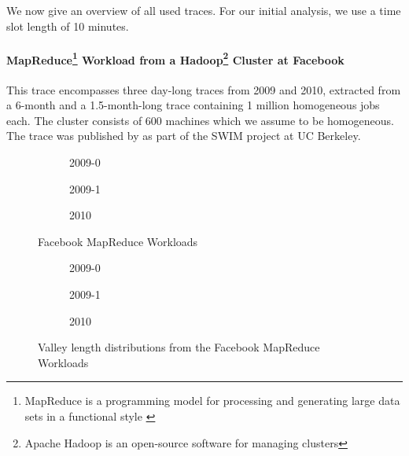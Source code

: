 We now give an overview of all used traces. For our initial analysis, we use a time slot length of 10 minutes.

\paragraph{MapReduce\footnote{MapReduce is a programming model for processing and generating large data sets in a functional style \cite{Dean2004}} Workload from a Hadoop\footnote{Apache Hadoop is an open-source software for managing clusters} Cluster at Facebook \cite{SWIM2013}} This trace encompasses three day-long traces from 2009 and 2010, extracted from a 6-month and a 1.5-month-long trace containing 1 million homogeneous jobs each. The cluster consists of 600 machines which we assume to be homogeneous. The trace was published by \citeauthor*{SWIM2013} as part of the SWIM project at UC Berkeley.

\begin{figure}
    \begin{subfigure}[b]{.3\linewidth}
    \resizebox{\textwidth}{!}{}
    \caption{2009-0}
    \end{subfigure}
    \begin{subfigure}[b]{.3\linewidth}
    \resizebox{\textwidth}{!}{}
    \caption{2009-1}
    \end{subfigure}
    \begin{subfigure}[b]{.3\linewidth}
    \resizebox{\textwidth}{!}{}
    \caption{2010}
    \end{subfigure}
    \caption{Facebook MapReduce Workloads}
    \label{tab:facebook:histogram}
\end{figure}

\begin{figure}
    \begin{subfigure}[b]{.3\linewidth}
    \resizebox{\textwidth}{!}{}
    \caption{2009-0}
    \end{subfigure}
    \begin{subfigure}[b]{.3\linewidth}
    \resizebox{\textwidth}{!}{}
    \caption{2009-1}
    \end{subfigure}
    \begin{subfigure}[b]{.3\linewidth}
    \resizebox{\textwidth}{!}{}
    \caption{2010}
    \end{subfigure}
    \caption{Valley length distributions from the Facebook MapReduce Workloads}
    \label{tab:facebook:valley_lengths}
\end{figure}

